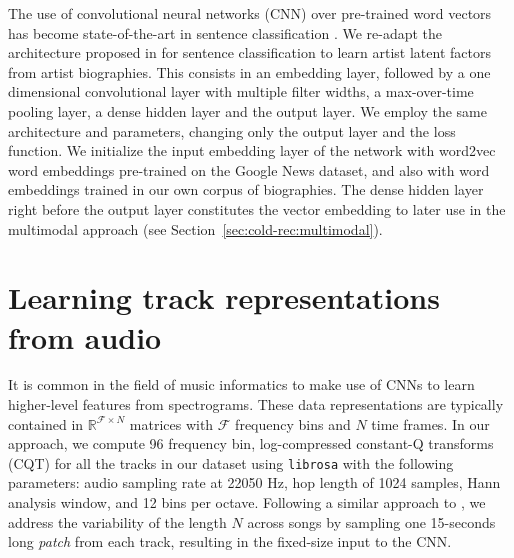 The use of convolutional neural networks (CNN) over pre-trained word vectors has become state-of-the-art in sentence classification \citep{Kim2014}. 
We re-adapt the architecture proposed in \cite{Kim2014} for sentence classification to learn artist latent factors from artist biographies. This consists in an embedding layer, followed by a one dimensional convolutional layer with multiple filter widths, a max-over-time pooling layer, a dense hidden layer and the output layer. We employ the same architecture and parameters, changing only the output layer and the loss function. We initialize the input embedding layer of the network with word2vec word embeddings pre-trained on the Google News dataset, and also with word embeddings trained in our own corpus of biographies. The dense hidden layer right before the output layer constitutes the vector embedding to later use in the multimodal approach (see Section~\ref{sec:cold-rec:multimodal}).



\section{Learning track representations from audio}\label{sec:cold-rec:audio}

It is common in the field of music informatics to make use of CNNs to learn higher-level features from spectrograms.
These data representations are typically contained in $\mathbb{R}^{\mathcal{F} \times N}$ matrices with $\mathcal{F}$ frequency bins and $N$ time frames.
In our approach, we compute 96 frequency bin, log-compressed constant-Q transforms (CQT) \citep{Schorkhuber2010} for all the tracks in our dataset using \texttt{librosa} \citep{Mcfee2015} with the following parameters: audio sampling rate at 22050 Hz, hop length of 1024 samples, Hann analysis window, and 12 bins per octave.
Following a similar approach to \cite{Oord2013}, we address the variability of the length $N$ across songs by sampling one 15-seconds long \emph{patch} from each track, resulting in the fixed-size input to the CNN.

